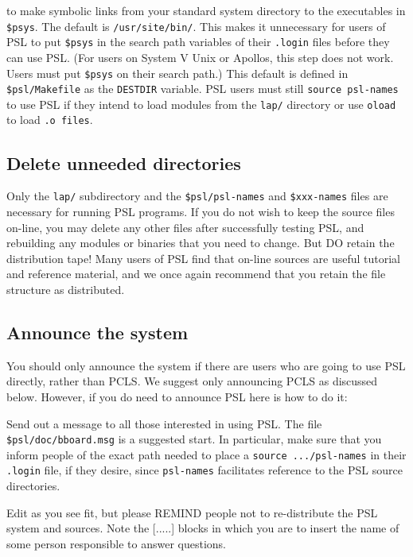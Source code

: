 to make symbolic links from your standard system directory to the
executables in {\tt \$psys}.  The default is {\tt /usr/site/bin/}.
This makes it unnecessary for users of PSL to put {\tt \$psys} in the
search path variables of their {\tt .login} files before they can use
PSL.  (For users on System V Unix or Apollos, this step does not work.
Users must put {\tt \$psys} on their search path.)  This default is
defined in {\tt \$psl/Makefile} as the {\tt DESTDIR} variable.  PSL
users must still {\tt source psl-names} to use PSL if they intend to
load modules from the {\tt lap/} directory or use {\tt oload} to load
{\tt .o files}.

\subsection{Delete unneeded directories}

Only the {\tt lap/} subdirectory and the {\tt \$psl/psl-names} and
{\tt \$xxx-names} files are  necessary for running PSL
programs.  If you do not wish to keep the source files on-line, you
may delete any other files after successfully testing PSL, and
rebuilding any modules or binaries that you need to change.  But DO
retain the distribution tape!  Many users of PSL find that on-line
sources are useful tutorial and reference material, and we once again
recommend that you retain the file structure as distributed.

\subsection{Announce the system}

You should only announce the system if there are users who are going
to use PSL directly, rather than PCLS.  We suggest only announcing
PCLS as discussed below.  However, if you do need to announce PSL here
is how to do it:

Send out a message to all those interested in using PSL.  The file
{\tt \$psl/doc/bboard.msg} is a suggested start.  In particular, make
sure that you inform people of the exact path needed to place a
{\tt source .../psl-names} in their {\tt .login} file, if they desire, since
{\tt psl-names} facilitates reference to the PSL source directories.

Edit as you see fit, but please REMIND people not to re-distribute the PSL
system and sources. Note the [.....] blocks in which you are to insert
the name of some person responsible to answer questions.


